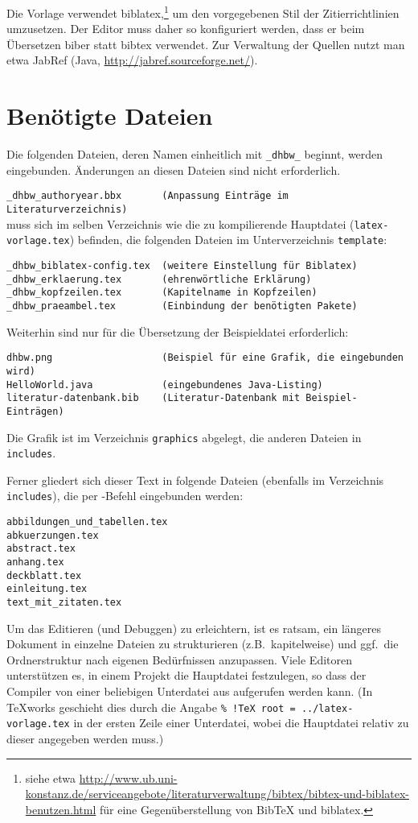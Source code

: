    
Die Vorlage verwendet biblatex,\footnote{siehe etwa \url{http://www.ub.uni-konstanz.de/serviceangebote/literaturverwaltung/bibtex/bibtex-und-biblatex-benutzen.html} für eine Gegenüberstellung von BibTeX und biblatex.}
um den vorgegebenen Stil der Zitierrichtlinien umzusetzen. Der Editor muss daher so konfiguriert werden, dass er beim Übersetzen biber statt bibtex verwendet. Zur Verwaltung der Quellen nutzt man etwa JabRef (Java, \url{http://jabref.sourceforge.net/}).

\section{Benötigte Dateien}

Die folgenden Dateien, deren Namen einheitlich mit \verb|_dhbw_| beginnt, werden eingebunden. Änderungen an diesen Dateien sind nicht erforderlich.

\verb|_dhbw_authoryear.bbx       (Anpassung Einträge im Literaturverzeichnis)| \\
muss sich im selben Verzeichnis wie die zu kompilierende Hauptdatei (\verb|latex-vorlage.tex|) befinden, die folgenden Dateien im Unterverzeichnis \verb|template|:
\begin{verbatim}
_dhbw_biblatex-config.tex  (weitere Einstellung für Biblatex)
_dhbw_erklaerung.tex       (ehrenwörtliche Erklärung)
_dhbw_kopfzeilen.tex       (Kapitelname in Kopfzeilen) 
_dhbw_praeambel.tex        (Einbindung der benötigten Pakete)
\end{verbatim}

Weiterhin sind nur für die Übersetzung der Beispieldatei erforderlich:
\begin{verbatim}
dhbw.png                   (Beispiel für eine Grafik, die eingebunden wird)
HelloWorld.java            (eingebundenes Java-Listing)
literatur-datenbank.bib    (Literatur-Datenbank mit Beispiel-Einträgen)
\end{verbatim}
Die Grafik ist im Verzeichnis \verb|graphics| abgelegt, die anderen Dateien in \verb|includes|. 

Ferner gliedert sich dieser Text in folgende Dateien (ebenfalls im Verzeichnis \verb|includes|), die per \verb||-Befehl eingebunden werden:
\begin{verbatim}
abbildungen_und_tabellen.tex
abkuerzungen.tex
abstract.tex
anhang.tex
deckblatt.tex
einleitung.tex
text_mit_zitaten.tex
\end{verbatim}

Um das Editieren (und Debuggen) zu erleichtern, ist es ratsam, ein längeres Dokument in einzelne Dateien zu strukturieren (z.B.\ kapitelweise) und ggf.\ die Ordnerstruktur nach eigenen Bedürfnissen anzupassen. Viele Editoren unterstützen es, in einem Projekt die Hauptdatei festzulegen, so dass der Compiler von einer beliebigen Unterdatei aus aufgerufen werden kann. (In TeXworks geschieht dies durch die Angabe \verb|% !TeX root = ../latex-vorlage.tex| in der ersten Zeile einer Unterdatei, wobei die Hauptdatei relativ zu dieser angegeben werden muss.)

